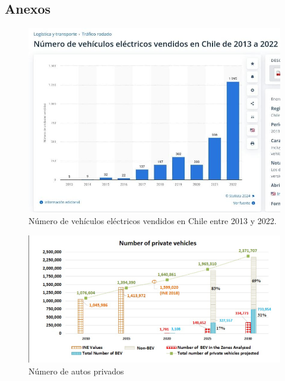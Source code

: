 \documentclass[letterpaper]{article}
\begin{document}
\begin{flushleft}
	\section{Anexos}
	\begin{figure}[htbp]
			\centering
			\includegraphics[scale=0.4]{grafica-1}
			\caption{Número de vehículos eléctricos vendidos en Chile entre 2013 y 2022. \cite{statista}}
			\label{fig:grafica1}
		\end{figure}
	
	\begin{figure}[htbp]
			\centering
			\includegraphics[scale=0.5]{grafica-2}
			\caption{Número de autos privados \cite{paredes}}
			\label{fig:grafica2}
		\end{figure}

	\end{flushleft}
\end{document}
